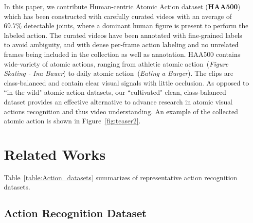 \documentclass[10pt,twocolumn,letterpaper]{article}
\begin{document}
In this paper, we contribute Human-centric Atomic Action dataset (\textbf{HAA500}) which has been constructed with carefully curated videos with an average of 69.7\% detectable joints, where a dominant human figure is present to perform the labeled action. The curated videos have been annotated with fine-grained labels to avoid ambiguity, and with dense per-frame action labeling and no unrelated frames being included in the collection as well as annotation.
HAA500 contains wide-variety of atomic actions, ranging from athletic atomic action~(\textit{Figure Skating - Ina Bauer}) to daily atomic action~(\textit{Eating a Burger}).
The clips are class-balanced and contain clear visual signals with little occlusion. As opposed to ``in the wild" atomic action datasets, our ``cultivated" clean, class-balanced dataset provides an effective alternative to advance research in atomic visual actions recognition and thus video understanding. An example of the collected atomic action is shown in Figure~\ref{fig:teaser2}.





\section{Related Works}

Table~\ref{table:Action_datasets} summarizes of representative action recognition datasets.

\subsection{Action Recognition Dataset}
\end{document}
